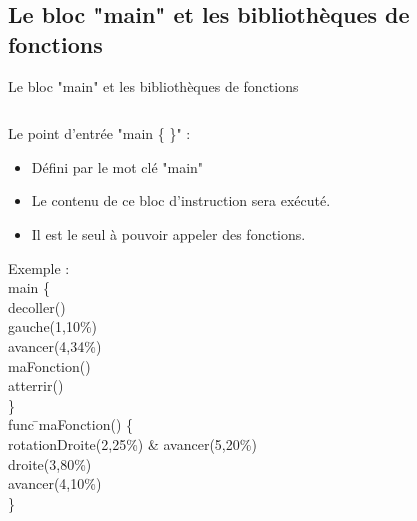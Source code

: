 \documentclass{bredelebeamer}
\begin{document}
\subsection{Le bloc "main" et les bibliothèques de fonctions} 
\begin{frame}{Le bloc "main" et les bibliothèques de fonctions} 

\begin{columns}

\begin{column}{0.5\textwidth}


Le point d'entrée "main \{ \}" :\\
\begin{itemize}
\item Défini par le mot clé "main"
\item Le contenu de ce bloc d'instruction sera exécuté.
\item Il est le seul à pouvoir appeler des fonctions.
\end{itemize}\pause

\begin{tabbing}
Exemple : \=\\
	\>\color{Framarouge}main  \{\=\\ 
	\>\>\color{Framarouge}decoller()\\
	\>\>\color{Framarouge}gauche(\color{black}1\color{Framarouge},\color{Framagris}10\%\color{Framarouge})\\ 
	\>\>\color{Framarouge}avancer(\color{black}4\color{Framarouge},\color{Framagris}34\%\color{Framarouge})\\
	\>\>\color{Framarouge}maFonction()\\ 
	\>\>\color{Framarouge}atterrir()\\
	\>\color{Framarouge}\}\\
	
	\>\color{Framarouge}func \=\color{black}maFonction\color{Framarouge}() \{\\ 
	\>\>\color{Framarouge}rotationDroite(\color{black}2\color{Framarouge},\color{Framagris}25\%\color{Framarouge}) \& 
	\color{Framarouge}avancer(\color{black}5\color{Framarouge},\color{Framagris}20\%\color{Framarouge})\\ 
	\>\>\color{Framarouge}droite(\color{black}3\color{Framarouge},\color{Framagris}80\%\color{Framarouge})\\ 
	\>\>\color{Framarouge}avancer(\color{black}4\color{Framarouge},\color{Framagris}10\%\color{Framarouge})\\ 
	\>\color{Framarouge}\}\pause


\end{tabbing}
\end{column}
\end{columns}
\end{frame}
\end{document}
